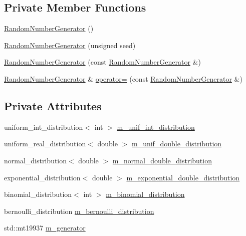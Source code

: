 \subsection*{Private Member Functions}
\begin{DoxyCompactItemize}
\item 
\hyperlink{class_random_number_generator_a8e7e711ea58f13f3ed95becbe33684e9}{Random\+Number\+Generator} ()
\item 
\hyperlink{class_random_number_generator_acef4ebf02f3377b707787aa1f69aff1d}{Random\+Number\+Generator} (unsigned seed)
\item 
\hyperlink{class_random_number_generator_a0007ec836f6bb43c27e2082264189c4c}{Random\+Number\+Generator} (const \hyperlink{class_random_number_generator}{Random\+Number\+Generator} \&)
\item 
\hyperlink{class_random_number_generator}{Random\+Number\+Generator} \& \hyperlink{class_random_number_generator_a5986c38214e8c774239eee89c768f172}{operator=} (const \hyperlink{class_random_number_generator}{Random\+Number\+Generator} \&)
\end{DoxyCompactItemize}
\subsection*{Private Attributes}
\begin{DoxyCompactItemize}
\item 
uniform\+\_\+int\+\_\+distribution$<$ int $>$ \hyperlink{class_random_number_generator_a7a3a5b9bfbb1306f364704bc3a9860b6}{m\+\_\+unif\+\_\+int\+\_\+distribution}
\item 
uniform\+\_\+real\+\_\+distribution$<$ double $>$ \hyperlink{class_random_number_generator_ab7697a4a0f3efe902aa49828bd78f1e2}{m\+\_\+unif\+\_\+double\+\_\+distribution}
\item 
normal\+\_\+distribution$<$ double $>$ \hyperlink{class_random_number_generator_af52b8c4de45f210754524225e97279b1}{m\+\_\+normal\+\_\+double\+\_\+distribution}
\item 
exponential\+\_\+distribution$<$ double $>$ \hyperlink{class_random_number_generator_ac5c29b50fc9b914fffd34d5730a62ca7}{m\+\_\+exponential\+\_\+double\+\_\+distribution}
\item 
binomial\+\_\+distribution$<$ int $>$ \hyperlink{class_random_number_generator_a0669afa8b2ad0fd544f140e294ce581f}{m\+\_\+binomial\+\_\+distribution}
\item 
bernoulli\+\_\+distribution \hyperlink{class_random_number_generator_ae0cd7e84eca4dba3ba65902ffff61e96}{m\+\_\+bernoulli\+\_\+distribution}
\item 
std\+::mt19937 \hyperlink{class_random_number_generator_a2fd6f5958a3c4500beee344d6af66a39}{m\+\_\+generator}
\end{DoxyCompactItemize}
